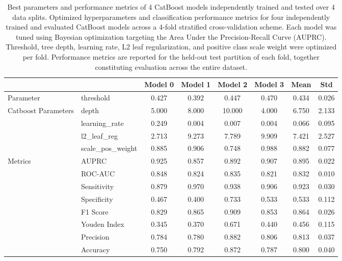 \documentclass[pdflatex,sn-vancouver-num]{sn-jnl}
\begin{document}
\begin{table}[t]
\centering
\footnotesize
\begin{tabular}{llcccccc}
\toprule
& & Model 0 & Model 1 & Model 2 & Model 3 & Mean & Std\\
\midrule
Parameter &  threshold & 0.427 & 0.392 & 0.447 & 0.470 & 0.434 & 0.026 \\
\midrule
Catboost Parameters & depth & 5.000 & 8.000 & 10.000 & 4.000 & 6.750 & 2.133 \\
& learning\_rate & 0.249 & 0.004 & 0.007 & 0.004 & 0.066 & 0.095 \\
& l2\_leaf\_reg & 2.713 & 9.273 & 7.789 & 9.909 & 7.421 & 2.527 \\
& scale\_pos\_weight & 0.885 & 0.906 & 0.748 & 0.988 & 0.882 & 0.077 \\
\midrule
Metrics & AUPRC & 0.925 & 0.857 & 0.892 & 0.907 & 0.895 & 0.022 \\
& ROC-AUC & 0.848 & 0.824 & 0.835 & 0.821 & 0.832 & 0.010 \\
& Sensitivity & 0.879 & 0.970 & 0.938 & 0.906 & 0.923 & 0.030 \\
& Specificity & 0.467 & 0.400 & 0.733 & 0.533 & 0.533 & 0.112 \\
& F1 Score & 0.829 & 0.865 & 0.909 & 0.853 & 0.864 & 0.026 \\
& Youden Index & 0.345 & 0.370 & 0.671 & 0.440 & 0.456 & 0.115 \\
& Precision & 0.784 & 0.780 & 0.882 & 0.806 & 0.813 & 0.037 \\
& Accuracy & 0.750 & 0.792 & 0.872 & 0.787 & 0.800 & 0.040 \\
\bottomrule
\end{tabular}
\caption{Best parameters and performance metrics of 4 CatBoost models independently trained and tested over 4 data splits. Optimized hyperparameters and classification performance metrics for four independently trained and evaluated CatBoost models across a 4-fold stratified cross-validation scheme. Each model was tuned using Bayesian optimization targeting the Area Under the Precision-Recall Curve (AUPRC). Threshold, tree depth, learning rate, L2 leaf regularization, and positive class scale weight were optimized per fold. Performance metrics are reported for the held-out test partition of each fold, together constituting evaluation across the entire dataset.}
\label{tab:catboost_metrics_first4}
\end{table}
\end{document}
